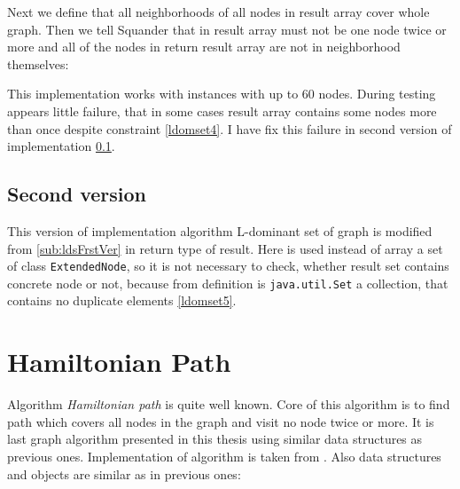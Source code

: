 \documentclass[11pt,twoside,a4paper]{book}
\begin{document}


Next we define that all neighborhoods of all nodes in result array cover
whole graph. Then we tell Squander that in result array must not be one node
twice or more and all of the nodes in return result array are not in
neighborhood themselves:



This implementation works with instances with up to 60 nodes. During
testing appears little failure, that in some cases result array contains some
nodes more than once despite constraint \ref{ldomset4}. I have fix this failure
in second version of implementation \ref{sub:ldsScndVer}.



\subsection{Second version}
\label{sub:ldsScndVer}

This version of implementation algorithm L-dominant set of graph is modified
from \ref{sub:ldsFrstVer} in return type of result. Here is used instead of
array a set of class \verb|ExtendedNode|, so it is not necessary to check,
whether result set contains concrete node or not, because from definition
\cite{oracle:javadocSet} is \verb|java.util.Set| a collection, that contains no
duplicate elements \ref{ldomset5}.


 
\section{Hamiltonian Path}
\label{sec:hp}
Algorithm \textit{Hamiltonian path} is quite well known. Core of this algorithm
is to find path which covers all nodes in the graph and visit no node twice or
more. It is last graph algorithm presented in this thesis using similar data
structures as previous ones. Implementation of algorithm is taken from
\cite{milicevic:executableSpecificationsForJavaPrograms}. Also data structures
and objects are similar as in previous ones:
\end{document}
